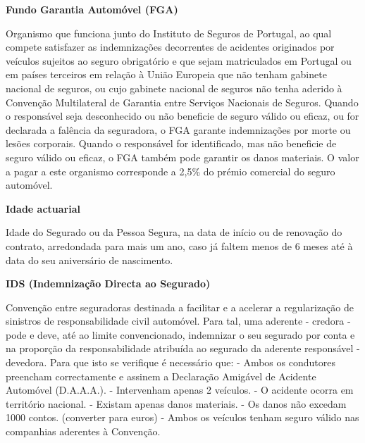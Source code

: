 \begin{description}
\item \textbf{Fundo Garantia Automóvel (FGA)}

Organismo que funciona junto do Instituto de Seguros de Portugal, ao qual compete satisfazer as indemnizações decorrentes de acidentes originados por veículos sujeitos ao seguro obrigatório e que sejam matriculados em Portugal ou em países terceiros em relação à União Europeia que não tenham gabinete nacional de seguros, ou cujo gabinete nacional de seguros não tenha aderido à Convenção Multilateral de Garantia entre Serviços Nacionais de Seguros. Quando o responsável seja desconhecido ou não beneficie de seguro válido ou eficaz, ou for declarada a falência da seguradora, o FGA garante indemnizações por morte ou lesões corporais. Quando o responsável for identificado, mas não beneficie de seguro válido ou eficaz, o FGA também pode garantir os danos materiais. O valor a pagar a este organismo corresponde a 2,5\% do prémio comercial do seguro automóvel.
\end{description}

\begin{description}
\item \textbf{Idade actuarial}

Idade do Segurado ou da Pessoa Segura, na data de início ou de renovação do contrato, arredondada para mais um ano, caso já faltem menos de 6 meses até à data do seu aniversário de nascimento.
\end{description}

\begin{description}
\item \textbf{IDS (Indemnização Directa ao Segurado)}

Convenção entre seguradoras destinada a facilitar e a acelerar a regularização de sinistros de responsabilidade civil automóvel. Para tal, uma aderente - credora - pode e deve, até ao limite convencionado, indemnizar o seu segurado por conta e na proporção da responsabilidade atribuída ao segurado da aderente responsável - devedora. Para que isto se verifique é necessário que: - Ambos os condutores preencham correctamente e assinem a Declaração Amigável de Acidente Automóvel (D.A.A.A.). - Intervenham apenas 2 veículos. - O acidente ocorra em território nacional. - Existam apenas danos materiais. - Os danos não excedam 1000 contos. (converter para euros) - Ambos os veículos tenham seguro válido nas companhias aderentes à Convenção.
\end{description}

